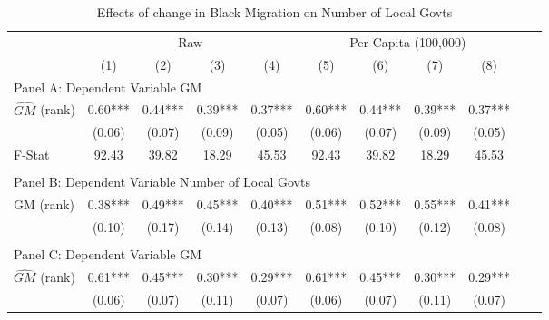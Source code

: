  \begin{table}[htbp]\centering {} \begin{threeparttable} \caption{Effects of change in Black Migration on Number of Local Govts} \begin{tabular}{l*{10}{c}} \toprule
                &\multicolumn{4}{c}{Raw}                                    &\multicolumn{4}{c}{Per Capita (100,000)}                   \\\cmidrule(lr){2-5}\cmidrule(lr){6-9}
                &\multicolumn{1}{c}{(1)}   &\multicolumn{1}{c}{(2)}   &\multicolumn{1}{c}{(3)}   &\multicolumn{1}{c}{(4)}   &\multicolumn{1}{c}{(5)}   &\multicolumn{1}{c}{(6)}   &\multicolumn{1}{c}{(7)}   &\multicolumn{1}{c}{(8)}   \\
\cmidrule(lr){1-9}
\multicolumn{8}{l}{Panel A: Dependent Variable GM}\\
\cmidrule(lr){1-9}
$\hat{GM}$ (rank)&       0.60***&       0.44***&       0.39***&       0.37***&       0.60***&       0.44***&       0.39***&       0.37***\\
                &     (0.06)   &     (0.07)   &     (0.09)   &     (0.05)   &     (0.06)   &     (0.07)   &     (0.09)   &     (0.05)   \\
\midrule
F-Stat          &      92.43   &      39.82   &      18.29   &      45.53   &      92.43   &      39.82   &      18.29   &      45.53   \\
\cmidrule[\heavyrulewidth](lr){1-9} \\ \cmidrule[\heavyrulewidth](lr){1-9}
\multicolumn{8}{l}{Panel B: Dependent Variable Number of Local Govts}\\
\cmidrule(lr){1-9}
GM  (rank)      &       0.38***&       0.49***&       0.45***&       0.40***&       0.51***&       0.52***&       0.55***&       0.41***\\
                &     (0.10)   &     (0.17)   &     (0.14)   &     (0.13)   &     (0.08)   &     (0.10)   &     (0.12)   &     (0.08)   \\
\cmidrule[\heavyrulewidth](lr){1-9} \\ \cmidrule[\heavyrulewidth](lr){1-9}
\multicolumn{8}{l}{Panel C: Dependent Variable GM}\\
\cmidrule(lr){1-9}
$\hat{GM}$ (rank)&       0.61***&       0.45***&       0.30***&       0.29***&       0.61***&       0.45***&       0.30***&       0.29***\\
                &     (0.06)   &     (0.07)   &     (0.11)   &     (0.07)   &     (0.06)   &     (0.07)   &     (0.11)   &     (0.07)   \\

\end{tabular}
\end{threeparttable}
\end{table}
